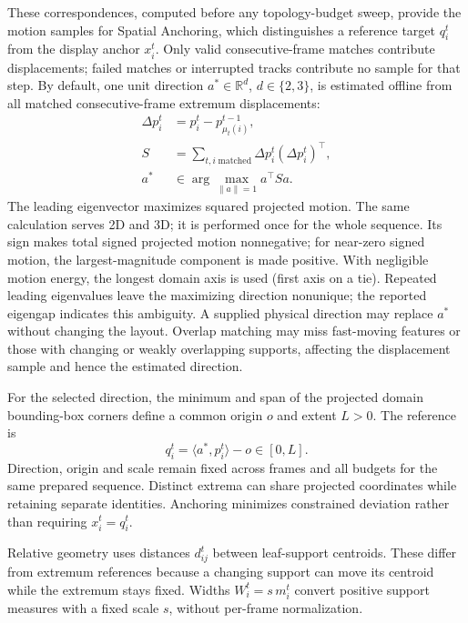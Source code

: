 \documentclass[review]{vgtc}
\begin{document}
These correspondences, computed before any topology-budget sweep, provide the motion samples for Spatial Anchoring, which distinguishes a reference target $q_i^t$ from the display anchor $x_i^t$. Only valid consecutive-frame matches contribute displacements; failed matches or interrupted tracks contribute no sample for that step. By default, one unit direction $a^*\in\mathbb{R}^d$, $d\in\{2,3\}$, is estimated offline from all matched consecutive-frame extremum displacements:
\begin{equation}\label{eq:autodirection}
\begin{aligned}
 \Delta p_i^t&=p_i^t-p_{\mu_t(i)}^{t-1},\\
 S&=\sum_{t,i\;\mathrm{matched}}\Delta p_i^t(\Delta p_i^t)^\top,\\
 a^*&\in\arg\max_{\|a\|=1}a^\top Sa.
\end{aligned}
\end{equation}
The leading eigenvector maximizes squared projected motion. The same calculation serves 2D and 3D; it is performed once for the whole sequence. Its sign makes total signed projected motion nonnegative; for near-zero signed motion, the largest-magnitude component is made positive. With negligible motion energy, the longest domain axis is used (first axis on a tie). Repeated leading eigenvalues leave the maximizing direction nonunique; the reported eigengap indicates this ambiguity. A supplied physical direction may replace $a^*$ without changing the layout. Overlap matching may miss fast-moving features or those with changing or weakly overlapping supports, affecting the displacement sample and hence the estimated direction.


For the selected direction, the minimum and span of the projected domain bounding-box corners define a common origin $o$ and extent $L>0$. The reference is
\begin{equation}\label{eq:reference}
 q_i^t=\langle a^*,p_i^t\rangle-o\in[0,L].
\end{equation}
Direction, origin and scale remain fixed across frames and all budgets for the same prepared sequence. Distinct extrema can share projected coordinates while retaining separate identities. Anchoring minimizes constrained deviation rather than requiring $x_i^t=q_i^t$.

Relative geometry uses distances $d_{ij}^t$ between leaf-support centroids. These differ from extremum references because a changing support can move its centroid while the extremum stays fixed. Widths $W_i^t=s\,m_i^t$ convert positive support measures with a fixed scale $s$, without per-frame normalization.
\end{document}
